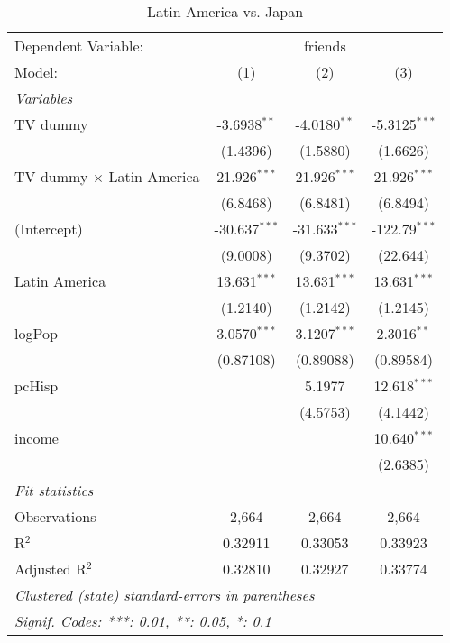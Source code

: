\begin{table}[htbp]
\centering
\caption{Latin America vs. Japan}
\begin{tabular}{lccc}
\tabularnewline\midrule\midrule
Dependent Variable:&\multicolumn{3}{c}{friends}\\
Model:&(1) & (2) & (3)\\
\midrule \emph{Variables}&   &   &  \\
TV dummy & -3.6938$^{**}$ & -4.0180$^{**}$ & -5.3125$^{***}$\\
  &(1.4396) & (1.5880) & (1.6626)\\
TV dummy $\times$ Latin America & 21.926$^{***}$ & 21.926$^{***}$ & 21.926$^{***}$\\
  &(6.8468) & (6.8481) & (6.8494)\\
(Intercept) & -30.637$^{***}$ & -31.633$^{***}$ & -122.79$^{***}$\\
  &(9.0008) & (9.3702) & (22.644)\\
Latin America & 13.631$^{***}$ & 13.631$^{***}$ & 13.631$^{***}$\\
  &(1.2140) & (1.2142) & (1.2145)\\
logPop & 3.0570$^{***}$ & 3.1207$^{***}$ & 2.3016$^{**}$\\
  &(0.87108) & (0.89088) & (0.89584)\\
pcHisp &    & 5.1977 & 12.618$^{***}$\\
  &   & (4.5753) & (4.1442)\\
income &    &    & 10.640$^{***}$\\
  &   &    & (2.6385)\\
\midrule \emph{Fit statistics}&  & & \\
Observations & 2,664&2,664&2,664\\
R$^2$ & 0.32911&0.33053&0.33923\\
Adjusted R$^2$ & 0.32810&0.32927&0.33774\\
\midrule\midrule\multicolumn{4}{l}{\emph{Clustered (state) standard-errors in parentheses}}\\
\multicolumn{4}{l}{\emph{Signif. Codes: ***: 0.01, **: 0.05, *: 0.1}}\\
\end{tabular}
\end{table}

